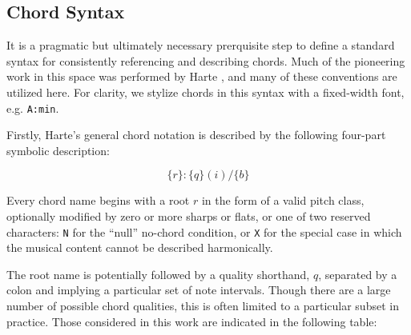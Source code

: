 
\subsection{Chord Syntax}
\label{sec:chord_syntax}

It is a pragmatic but ultimately necessary prerquisite step to define a standard syntax for consistently referencing and describing chords.
Much of the pioneering work in this space was performed by Harte \cite{Harte2010}, and many of these conventions are utilized here.
For clarity, we stylize chords in this syntax with a fixed-width font, e.g. \texttt{A:min}.

Firstly, Harte's general chord notation is described by the following four-part symbolic description:

\begin{equation}
\{r\}:\{q\}(i)/\{b\}
\end{equation}

\noindent Every chord name begins with a root $r$ in the form of a valid pitch class, optionally modified by zero or more sharps or flats, or one of two reserved characters: \texttt{N} for the ``null'' no-chord condition, or \texttt{X} for the special case in which the musical content cannot be described harmonically.

The root name is potentially followed by a quality shorthand, $q$, separated by a colon and implying a particular set of note intervals.
Though there are a large number of possible chord qualities, this is often limited to a particular subset in practice.
Those considered in this work are indicated in the following table:

